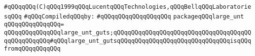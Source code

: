 \label{src/lib/std/large-unt.pkg}
\verb|#qQQqqQQq(C)qQQq1999qQQqLucentqQQqTechnologies,qQQqBellqQQqLaboratoriesqQQq|\newline
\newline
\verb|#qQQqCompiledqQQqby:|\newline
\verb|#qQQqqQQqqQQqqQQqqQQq|\newline
\newline
\verb|packageqQQqlarge_unt|\newline
\verb|qQQqqQQqqQQqqQQq=|\newline
\verb|qQQqqQQqqQQqqQQqlarge_unt_guts;qQQqqQQqqQQqqQQqqQQqqQQqqQQqqQQqqQQqqQQqqQQqqQQqqQQq#qQQqlarge_unt_gutsqQQqqQQqqQQqqQQqqQQqqQQqqQQqqQQqisqQQqfromqQQqqQQqqQQq|\newline

